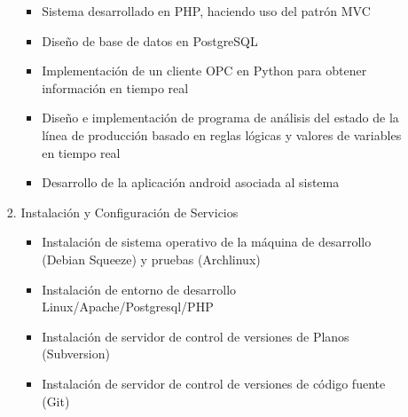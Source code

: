 \documentclass[letterpaper,12pt]{report}
\begin{document}
\begin{itemize}
\begin{itemize}
\begin{enumerate}
                \begin{itemize}
                \item Sistema desarrollado en PHP, haciendo uso del patrón MVC
                \item Diseño de base de datos en PostgreSQL
                \item Implementación de un cliente OPC en Python para obtener información en tiempo real
                \item Diseño e implementación de programa de análisis del estado de la línea de producción basado en reglas lógicas y valores de variables en tiempo real
                \item Desarrollo de la aplicación android asociada al sistema
                \end{itemize}
            \item Instalación y Configuración de Servicios
                \begin{itemize}
                \item Instalación de sistema operativo de la máquina de desarrollo (Debian Squeeze) y pruebas (Archlinux)
                \item Instalación de entorno de desarrollo Linux/Apache/Postgresql/PHP
                \item Instalación de servidor de control de versiones de Planos (Subversion)
                \item Instalación de servidor de control de versiones de código fuente (Git)
                \end{itemize}
            \end{enumerate}
        \end{itemize}
    

\end{itemize}
\end{document}
